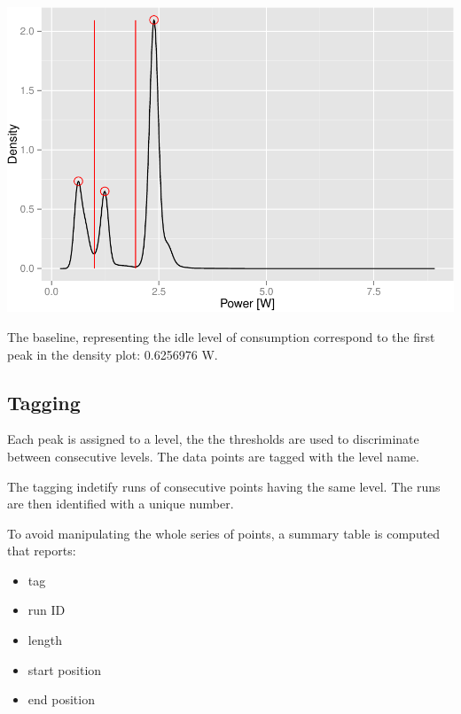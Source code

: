 \documentclass[]{article}
\begin{document}
\includegraphics{AnalysisProcedure_files/figure-latex/density-1.pdf}

The baseline, representing the idle level of consumption correspond to
the first peak in the density plot: 0.6256976 W.

\subsection{Tagging}\label{tagging}

Each peak is assigned to a level, the the thresholds are used to
discriminate between consecutive levels. The data points are tagged with
the level name.

The tagging indetify runs of consecutive points having the same level.
The runs are then identified with a unique number.

To avoid manipulating the whole series of points, a summary table is
computed that reports:

\begin{itemize}
\itemsep1pt\parskip0pt
\item
  tag
\item
  run ID
\item
  length
\item
  start position
\item
  end position
\end{itemize}
\end{document}
